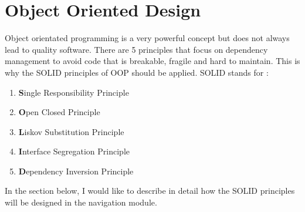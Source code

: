 \section{Object Oriented Design}
    Object orientated programming is a very powerful concept but does not always lead to quality
    software. There are 5 principles that focus on dependency management to avoid code that
    is breakable, fragile and hard to maintain. This is why the SOLID \cite{Hotop2015} 
    principles of OOP should be applied.
    SOLID stands for :
    \begin{enumerate}
        \item 
            \textbf{S}ingle Responsibility Principle
        \item 
            \textbf{O}pen Closed Principle
        \item 
            \textbf{L}iskov Substitution Principle
        \item 
            \textbf{I}nterface Segregation Principle
        \item 
            \textbf{D}ependency Inversion Principle
    \end{enumerate}
    In the section below, I would like to describe in detail how the SOLID principles will 
    be designed in the navigation module.

    
    
    
    
    